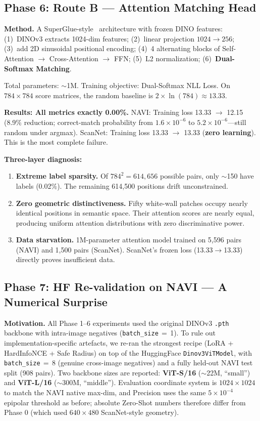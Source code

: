 \documentclass[11pt,a4paper]{article}
\begin{document}
\subsection{Phase 6: Route B --- Attention Matching Head}

\textbf{Method.} A SuperGlue-style~\cite{superglue} architecture with frozen DINO features: (1)~DINOv3 extracts 1024-dim features; (2)~linear projection $1024\rightarrow256$; (3)~add 2D sinusoidal positional encoding; (4)~4 alternating blocks of Self-Attention $\rightarrow$ Cross-Attention $\rightarrow$ FFN; (5)~L2 normalization; (6)~\textbf{Dual-Softmax Matching}.

Total parameters: $\sim$1M. Training objective: Dual-Softmax NLL Loss. On $784\!\times\!784$ score matrices, the random baseline is $2\times\ln(784) \approx 13.33$.

\textbf{Results: All metrics exactly 0.00\%.}
NAVI: Training loss 13.33 $\rightarrow$ 12.15 (8.9\% reduction; correct-match probability from $1.6\!\times\!10^{-6}$ to $5.2\!\times\!10^{-6}$---still random under argmax).
ScanNet: Training loss 13.33 $\rightarrow$ 13.33 (\textbf{zero learning}). This is the most complete failure.

\textbf{Three-layer diagnosis:}
\begin{enumerate}
    \item \textbf{Extreme label sparsity.} Of $784^2 = 614{,}656$ possible pairs, only $\sim$150 have labels (0.02\%). The remaining 614{,}500 positions drift unconstrained.
    \item \textbf{Zero geometric distinctiveness.} Fifty white-wall patches occupy nearly identical positions in semantic space. Their attention scores are nearly equal, producing uniform attention distributions with zero discriminative power.
    \item \textbf{Data starvation.} 1M-parameter attention model trained on 5,596 pairs (NAVI) and 1,500 pairs (ScanNet). ScanNet's frozen loss (13.33$\rightarrow$13.33) directly proves insufficient data.
\end{enumerate}

\subsection{Phase 7: HF Re-validation on NAVI --- A Numerical Surprise}
\label{sec:phase7}

\textbf{Motivation.} All Phase 1--6 experiments used the original DINOv3 \texttt{.pth} backbone with intra-image negatives (\texttt{batch\_size}\,$=$\,1). To rule out implementation-specific artefacts, we re-ran the strongest recipe (LoRA + HardInfoNCE + Safe Radius) on top of the HuggingFace \texttt{Dinov3ViTModel}, with \texttt{batch\_size}\,$=$\,8 (genuine cross-image negatives) and a fully held-out NAVI test split (908 pairs). Two backbone sizes are reported: \textbf{ViT-S/16} ($\sim$22M, ``small'') and \textbf{ViT-L/16} ($\sim$300M, ``middle''). Evaluation coordinate system is $1024\times1024$ to match the NAVI native max-dim, and Precision uses the same $5\times10^{-4}$ epipolar threshold as before; absolute Zero-Shot numbers therefore differ from Phase 0 (which used $640\times480$ ScanNet-style geometry).
\end{document}
